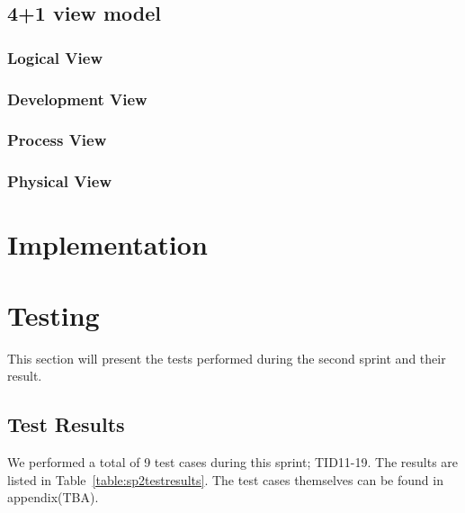 \subsection{4+1 view model}
\subsubsection{Logical View}
\subsubsection{Development View}
\subsubsection{Process View}
\subsubsection{Physical View}

\section{Implementation}


\section{Testing}
This section will present the tests performed during the second sprint and their result.

\subsection{Test Results}
We performed a total of 9 test cases during this sprint; TID11-19. The results are listed in Table~\ref{table:sp2testresults}. The test cases themselves can be found in appendix(TBA).


